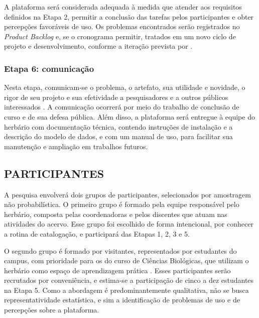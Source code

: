 \documentclass[
    12pt,        %
    openany,     %
    oneside,     %
    a4paper,     %
    english,     %
    french,      %
    spanish,     %
    brazil,      %
    article      %
]{abntex2}
\begin{document}
A plataforma será considerada adequada à medida que atender aos requisitos definidos na Etapa 2, permitir a conclusão das tarefas pelos participantes e obter percepções favoráveis de uso. Os problemas encontrados serão registrados no \textit{Product Backlog} e, se o cronograma permitir, tratados em um novo ciclo de projeto e desenvolvimento, conforme a iteração prevista por .

\subsubsection{Etapa 6: comunicação}
\label{subsubsec:etapa6}

Nesta etapa, comunicam-se o problema, o artefato, sua utilidade e novidade, o rigor de seu projeto e sua efetividade a pesquisadores e a outros públicos interessados \cite{peffers2007dsrm}. A comunicação ocorrerá por meio do trabalho de conclusão de curso e de sua defesa pública. Além disso, a plataforma será entregue à equipe do herbário com documentação técnica, contendo instruções de instalação e a descrição do modelo de dados, e com um manual de uso, para facilitar sua manutenção e ampliação em trabalhos futuros.

\subsection{PARTICIPANTES}
\label{subsec:participantes}

A pesquisa envolverá dois grupos de participantes, selecionados por amostragem não probabilística. O primeiro grupo é formado pela equipe responsável pelo herbário, composta pelas coordenadoras e pelos discentes que atuam nas atividades do acervo. Esse grupo foi escolhido de forma intencional, por conhecer a rotina de catalogação, e participará das Etapas 1, 2, 3 e 5.

O segundo grupo é formado por visitantes, representados por estudantes do campus, com prioridade para os do curso de Ciências Biológicas, que utilizam o herbário como espaço de aprendizagem prática \cite{lopes2023herbario}. Esses participantes serão recrutados por conveniência, e estima-se a participação de cinco a dez estudantes na Etapa 5. Como a abordagem é predominantemente qualitativa, não se busca representatividade estatística, e sim a identificação de problemas de uso e de percepções sobre a plataforma.
\end{document}
